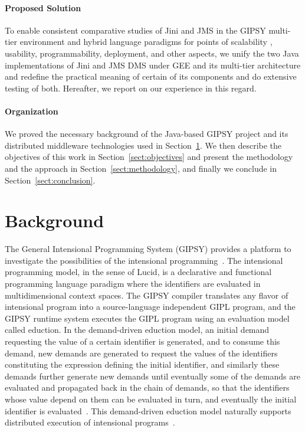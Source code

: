 \documentclass{easychair}
\newcommand{\xs}[1]{Section~\ref{#1}}
\newcommand{\gipsy}{{GIPSY\index{GIPSY}}}
\begin{document}
\paragraph{Proposed Solution}

To enable consistent comparative studies of Jini and JMS in the GIPSY multi-tier
environment and hybrid language paradigms 
\cite{gipsy-multi-tier-sac09,gipsy-type-system-c3s2e09,bin-han-10} for points
of scalability \cite{ji-yi-mcthesis-2011}, usability, programmability, deployment,
and other aspects, we unify the two Java implementations of Jini and JMS DMS
under GEE and its multi-tier architecture and redefine the practical meaning
of certain of its components and do extensive testing of both. Hereafter, we
report on our experience in this regard.

\paragraph{Organization}

We proved the necessary background of the Java-based {\gipsy} project and its
distributed middleware technologies used in \xs{sect:background}.
We then describe the objectives of this work in \xs{sect:objectives}
and present the methodology and the approach in \xs{sect:methodology},
and finally we conclude in \xs{sect:conclusion}.


\section{Background}
\label{sect:background}

The General Intensional Programming System ({\gipsy}) provides a platform to
investigate the possibilities of the intensional programming~\cite{gipsy-multi-tier-secasa09}.
The intensional programming model, in the sense of Lucid, is a declarative and functional programming
language paradigm where the identifiers are evaluated in multidimensional context spaces.
The {\gipsy} compiler translates any flavor of intensional program into a source-language
independent GIPL program, and the {\gipsy} runtime system executes the GIPL program using
an evaluation model called eduction. In the demand-driven eduction model, an initial demand
requesting the value of a certain identifier is generated, and to consume this demand,
new demands are generated to request the values of the identifiers constituting the expression
defining the initial identifier, and similarly these demands further generate new demands
until eventually some of the demands are evaluated and propagated back in the chain of demands,
so that the identifiers whose value depend on them can be evaluated in turn,
and eventually the initial identifier is evaluated~\cite{gipsy-multi-tier-secasa09}.
This demand-driven eduction model naturally supports distributed
execution of intensional programs~\cite{glu2,glu3}.
\end{document}
